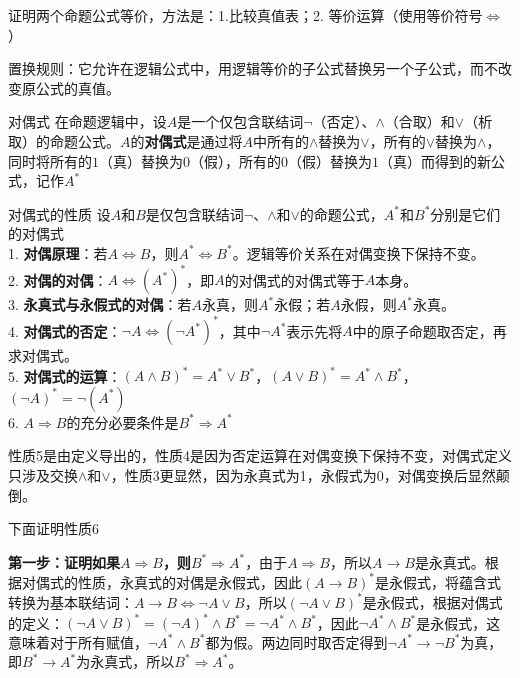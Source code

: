 \documentclass[lang=cn,11pt]{elegantbook}
\begin{document}
证明两个命题公式等价，方法是：1.比较真值表；2. 等价运算（使用等价符号$\Leftrightarrow$）

置换规则：它允许在逻辑公式中，用逻辑等价的子公式替换另一个子公式，而不改变原公式的真值。
\begin{definition}{对偶式}
    在命题逻辑中，设$A$是一个仅包含联结词$\neg$（否定）、$\land$（合取）和$\lor$（析取）的命题公式。$A$的\textbf{对偶式}是通过将$A$中所有的$\land$替换为$\lor$，所有的$\lor$替换为$\land$，同时将所有的$1$（真）替换为$0$（假），所有的$0$（假）替换为$1$（真）而得到的新公式，记作$A^*$
\end{definition}
\begin{theorem}{对偶式的性质}
设$A$和$B$是仅包含联结词$\neg$、$\land$和$\lor$的命题公式，$A^*$和$B^*$分别是它们的对偶式\\
1. \textbf{对偶原理}：若$A \Leftrightarrow B$，则$A^* \Leftrightarrow B^*$。逻辑等价关系在对偶变换下保持不变。\\
2. \textbf{对偶的对偶}：$A \Leftrightarrow (A^*)^*$，即$A$的对偶式的对偶式等于$A$本身。\\
3. \textbf{永真式与永假式的对偶}：若$A$永真，则$A^*$永假；若$A$永假，则$A^*$永真。\\
4. \textbf{对偶式的否定}：$\neg A \Leftrightarrow (\neg A^*)^*$，其中$\neg A^*$表示先将$A$中的原子命题取否定，再求对偶式。\\
5. \textbf{对偶式的运算}：$(A \land B)^* = A^* \lor B^*$，$(A \lor B)^* = A^* \land B^*$，$(\neg A)^* = \neg (A^*)$\\
6. $A\Rightarrow B$的充分必要条件是$B^* \Rightarrow A^*$
\end{theorem}
性质5是由定义导出的，性质4是因为否定运算在对偶变换下保持不变，对偶式定义只涉及交换$\land$和$\lor$，性质3更显然，因为永真式为1，永假式为0，对偶变换后显然颠倒。

下面证明性质6

\textbf{第一步：证明如果$A \Rightarrow B$，则$B^* \Rightarrow A^*$}，由于$A \Rightarrow B$，所以$A \rightarrow B$是永真式。根据对偶式的性质，永真式的对偶是永假式，因此$(A \rightarrow B)^* $是永假式，将蕴含式转换为基本联结词：$A \rightarrow B \Leftrightarrow \neg A \lor B$，所以$(\neg A \lor B)^* \text{是永假式}$，根据对偶式的定义：$(\neg A \lor B)^* = (\neg A)^* \land B^* = \neg A^* \land B^*$，因此$\neg A^* \land B^*$是永假式，这意味着对于所有赋值，$\neg A^* \land B^*$都为假。两边同时取否定得到$\neg A^* \rightarrow \neg B^*$为真，即$B^* \rightarrow A^*$为永真式，所以$B^* \Rightarrow A^*$。
\end{document}
